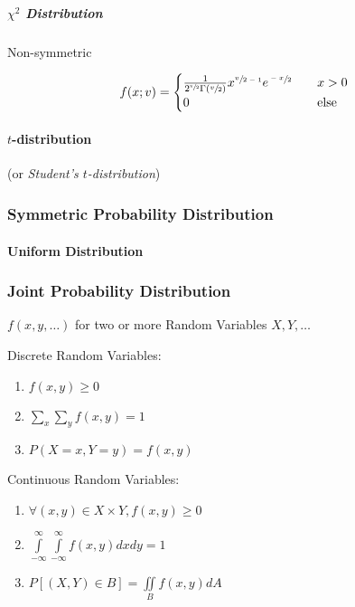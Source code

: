 \subparagraph{$\chi^2$ Distribution}\label{sec:chi_squared}\hfill

Non-symmetric

\[
  f(x; v) =
  \begin{cases}
  \frac{1}{2^{\sfrac{v}{2}}\Gamma(\sfrac{v}{2})} x^{\sfrac{v}{2-1}} e^{\sfrac{-x}{2}}     & \quad x > 0 \\
  0     & \quad\text{else} \\
  \end{cases}
\]



\paragraph{$t$-distribution}\label{sec:t_distribution}\hfill

(or \emph{Student's $t$-distribution})



\subsubsection{Symmetric Probability Distribution}
\label{sec:symmetric_probability}

\paragraph{Uniform Distribution}\label{sec:uniform_distribution}\hfill



\subsubsection{Joint Probability Distribution}
\label{sec:joint_probability}

$f(x,y,\ldots)$ for two or more Random Variables $X,Y,\ldots$

Discrete Random Variables:
\begin{enumerate}
  \item $f(x,y) \geq 0$
  \item $\sum_x \sum_y f(x,y) = 1$
  \item $P(X = x, Y = y) = f(x,y)$
\end{enumerate}

Continuous Random Variables:
\begin{enumerate}
  \item $\forall (x,y) \in X \times Y, f(x,y) \geq 0$
  \item $\int\limits_{-\infty}^{\infty} \int\limits_{-\infty}^{\infty}
    f(x,y) dx dy = 1$
  \item $P[(X,Y) \in B] = \iint\limits_B f(x,y) dA$
\end{enumerate}

